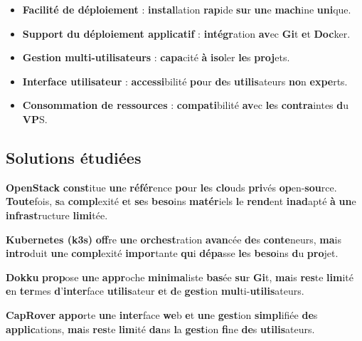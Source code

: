 \documentclass{rapportClass} %
\begin{document}
\begin{itemize}
\item \textbf{\textbf{Faci}lité \textbf{d}e \textbf{déploi}ement} : \textbf{instal}lation \textbf{rap}ide \textbf{su}r \textbf{un}e \textbf{mach}ine \textbf{uni}que.
\item \textbf{\textbf{Supp}ort \textbf{d}u \textbf{déploi}ement \textbf{appli}catif} : \textbf{intégr}ation \textbf{av}ec \textbf{Gi}t \textbf{e}t \textbf{Doc}ker.
\item \textbf{\textbf{Gest}ion \textbf{mul}ti-\textbf{utilis}ateurs} : \textbf{capa}cité \textbf{à} \textbf{iso}ler \textbf{le}s \textbf{proj}ets.
\item \textbf{\textbf{Inter}face \textbf{utilis}ateur} : \textbf{accessi}bilité \textbf{po}ur \textbf{de}s \textbf{utilis}ateurs \textbf{no}n \textbf{expe}rts.
\item \textbf{\textbf{Consom}mation \textbf{d}e \textbf{resso}urces} : \textbf{compati}bilité \textbf{av}ec \textbf{le}s \textbf{contra}intes \textbf{d}u \textbf{VP}S.
\end{itemize}

\subsection{Solutions étudiées}

\textbf{\textbf{OpenS}tack} \textbf{const}itue \textbf{un}e \textbf{référ}ence \textbf{po}ur \textbf{le}s \textbf{clo}uds \textbf{pri}vés
\textbf{op}en-\textbf{sou}rce. \textbf{Toute}fois, \textbf{s}a \textbf{compl}exité \textbf{e}t \textbf{se}s \textbf{beso}ins \textbf{matér}iels \textbf{l}e
\textbf{rend}ent \textbf{inad}apté \textbf{à} \textbf{un}e \textbf{infrast}ructure \textbf{limi}tée.

\textbf{\textbf{Kuber}netes (\textbf{k}3s)} \textbf{off}re \textbf{un}e \textbf{orchest}ration \textbf{avan}cée \textbf{de}s \textbf{conte}neurs,
\textbf{ma}is \textbf{intro}duit \textbf{un}e \textbf{compl}exité \textbf{impor}tante \textbf{qu}i \textbf{dépa}sse \textbf{le}s \textbf{beso}ins \textbf{d}u \textbf{pro}jet.

\textbf{\textbf{Dok}ku} \textbf{prop}ose \textbf{un}e \textbf{appr}oche \textbf{minima}liste \textbf{bas}ée \textbf{su}r \textbf{Gi}t, \textbf{ma}is
\textbf{res}te \textbf{lim}ité \textbf{e}n \textbf{ter}mes \textbf{d}’\textbf{inter}face \textbf{utilis}ateur \textbf{e}t \textbf{d}e \textbf{gest}ion \textbf{mul}ti-\textbf{utilis}ateurs.

\textbf{\textbf{CapR}over} \textbf{appo}rte \textbf{un}e \textbf{inter}face \textbf{we}b \textbf{e}t \textbf{un}e \textbf{gest}ion \textbf{simpl}ifiée
\textbf{de}s \textbf{applic}ations, \textbf{ma}is \textbf{res}te \textbf{lim}ité \textbf{da}ns \textbf{l}a \textbf{gest}ion \textbf{fi}ne \textbf{de}s \textbf{utilis}ateurs.
\end{document}
